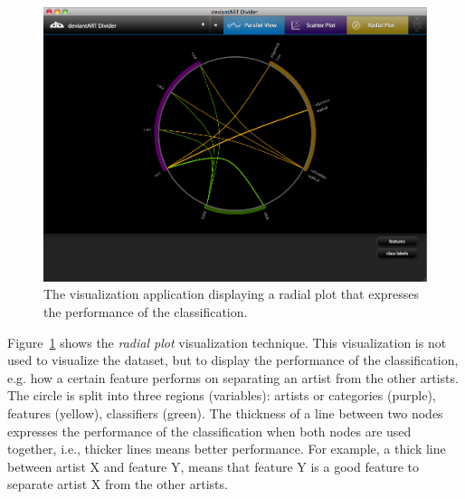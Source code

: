 \begin{figure}[htb]
  \centering
  \includegraphics[width=1\linewidth]{img/visualization_radial.png}
  \caption{The visualization application displaying a radial plot that expresses the performance of the classification.}
  \label{fig:visualization_radial}
\end{figure}

Figure~\ref{fig:visualization_radial} shows the \textit{radial plot} visualization technique.
This visualization is not used to visualize the dataset, but to display the performance of the classification, e.g. how a certain feature performs on separating an artist from the other artists.
The circle is split into three regions (variables): artists or categories (purple), features (yellow), classifiers (green).
The thickness of a line between two nodes expresses the performance of the classification when both nodes are used together, i.e., thicker lines means better performance.
For example, a thick line between artist X and feature Y, means that feature Y is a good feature to separate artist X from the other artists.
